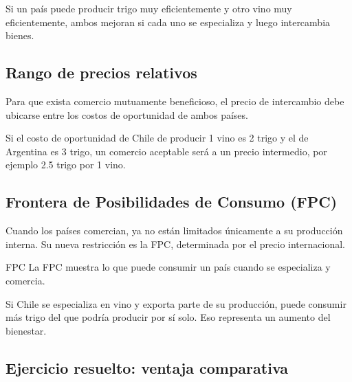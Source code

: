 \begin{ejemplo}
Si un país puede producir trigo muy eficientemente y otro vino muy eficientemente, ambos mejoran si cada uno se especializa y luego intercambia bienes.
\end{ejemplo}

\subsection{Rango de precios relativos}

Para que exista comercio mutuamente beneficioso, el precio de intercambio debe ubicarse entre los costos de oportunidad de ambos países.

\begin{ejemplo}
Si el costo de oportunidad de Chile de producir 1 vino es 2 trigo y el de Argentina es 3 trigo, un comercio aceptable será a un precio intermedio, por ejemplo 2.5 trigo por 1 vino.
\end{ejemplo}

\subsection{Frontera de Posibilidades de Consumo (FPC)}

Cuando los países comercian, ya no están limitados únicamente a su producción interna. Su nueva restricción es la FPC, determinada por el precio internacional.

\begin{concepto}{FPC}
La FPC muestra lo que puede consumir un país cuando se especializa y comercia.
\end{concepto}

\begin{ejemplo}
Si Chile se especializa en vino y exporta parte de su producción, puede consumir más trigo del que podría producir por sí solo. Eso representa un aumento del bienestar.
\end{ejemplo}

\subsection{Ejercicio resuelto: ventaja comparativa}

